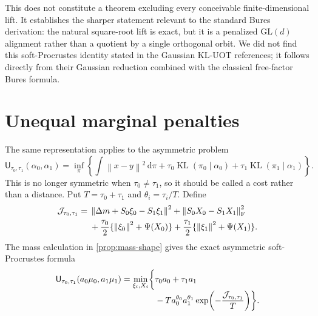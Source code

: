 \documentclass[11pt]{article}
\theoremstyle{definition}
\theoremstyle{remark}
\newcommand{\KL}{\operatorname{KL}}
\newcommand{\UOT}{\mathsf U}
\newcommand{\dd}{\,\mathrm d}
\newcommand{\norm}[1]{\left\lVert #1\right\rVert}
\begin{document}
This does not constitute a theorem excluding every conceivable
finite-dimensional lift. It establishes the sharper statement relevant to the
standard Bures derivation: the natural square-root lift is exact, but it is a
penalized $\mathrm{GL}(d)$ alignment rather than a quotient by a single
orthogonal orbit. We did not find this soft-Procrustes identity stated in the
Gaussian KL-UOT references; it follows directly from their Gaussian reduction
combined with the classical free-factor Bures formula.

\section{Unequal marginal penalties}\label{sec:asymmetric}

The same representation applies to the asymmetric problem
\begin{equation}\label{eq:asymmetric-uot}
 \UOT_{\tau_0,\tau_1}(\alpha_0,\alpha_1)
 =\inf_\pi\left\{
   \int\norm{x-y}^2\dd\pi
   +\tau_0\KL(\pi_0\mid\alpha_0)
   +\tau_1\KL(\pi_1\mid\alpha_1)
 \right\}.
\end{equation}
This is no longer symmetric when $\tau_0\neq\tau_1$, so it should be called a
cost rather than a distance. Put $T=\tau_0+\tau_1$ and
$\theta_i=\tau_i/T$. Define
\begin{align}
 \mathcal J_{\tau_0,\tau_1}
 ={}&\norm{\Delta m+S_0\xi_0-S_1\xi_1}^2
 +\norm{S_0X_0-S_1X_1}_{\mathrm F}^2\notag\\
 &+\frac{\tau_0}{2}\{\norm{\xi_0}^2+\Psi(X_0)\}
 +\frac{\tau_1}{2}\{\norm{\xi_1}^2+\Psi(X_1)\}.
 \label{eq:asymmetric-soft-energy}
\end{align}
The mass calculation in \cref{prop:mass-shape} gives the exact asymmetric
soft-Procrustes formula
\begin{align}
 \UOT_{\tau_0,\tau_1}(a_0\mu_0,a_1\mu_1)
 =\min_{\xi_i,X_i}\biggl\{&
 \tau_0a_0+\tau_1a_1\notag\\[-1mm]
 &-T a_0^{\theta_0}a_1^{\theta_1}
 \exp\!\left(-\frac{\mathcal J_{\tau_0,\tau_1}}{T}\right)
 \biggr\}.
 \label{eq:asymmetric-soft-uot}
\end{align}
\end{document}
